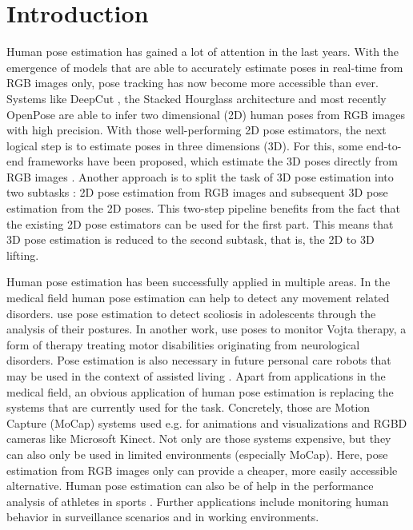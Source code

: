 \section{Introduction}

Human pose estimation has gained a lot of attention in the last years.
With the emergence of models that are able to accurately estimate poses in real-time from RGB images only, pose tracking has now become more accessible than ever.
Systems like DeepCut \cite{pishchulin16}, the Stacked Hourglass architecture \cite{newell16} and most recently OpenPose \cite{cao18} are able to infer two dimensional (2D) human poses from RGB images with high precision.
With those well-performing 2D pose estimators, the next logical step is to estimate poses in three dimensions (3D).
For this, some end-to-end frameworks have been proposed, which estimate the 3D poses directly from RGB images \cite{pavlakos17, park16, mehta17, mehta17_2}.
Another approach is to split the task of 3D pose estimation into two subtasks \cite{drover18, martinez17, moreno-noguer16}:
2D pose estimation from RGB images and subsequent 3D pose estimation from the 2D poses.
This two-step pipeline benefits from the fact that the existing 2D pose estimators can be used for the first part. 
This means that 3D pose estimation is reduced to the second subtask, that is, the 2D to 3D lifting.

Human pose estimation has been successfully applied in multiple areas.
In the medical field human pose estimation can help to detect any movement related disorders.
\citet{aroeira16} use pose estimation to detect scoliosis in adolescents through the analysis of their postures.
In another work, \citet{khan18} use poses to monitor Vojta therapy, a form of therapy treating motor disabilities originating from neurological disorders.
Pose estimation is also necessary in future personal care robots that may be used in the context of assisted living \cite{richter15}.
Apart from applications in the medical field, an obvious application of human pose estimation is replacing the systems that are currently used for the task.
Concretely, those are Motion Capture (MoCap) systems used e.g. for animations and visualizations and RGBD cameras like Microsoft Kinect.
Not only are those systems expensive, but they can also only be used in limited environments (especially MoCap).
Here, pose estimation from RGB images only can provide a cheaper, more easily accessible alternative.
Human pose estimation can also be of help in the performance analysis of athletes in sports \cite{einfalt18, zecha19}.
Further applications include monitoring human behavior in surveillance scenarios and in working environments.

